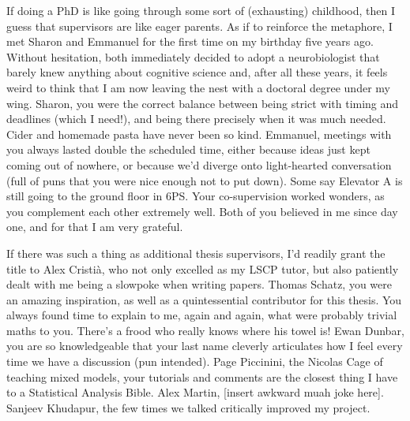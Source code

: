\documentclass[12pt, twoside]{report}
\begin{document}
If doing a PhD is like going through some sort of (exhausting) childhood, then I guess that supervisors are like eager parents. As if to reinforce the metaphore, I met Sharon and Emmanuel for the first time on my birthday five years ago. Without hesitation, both immediately decided to adopt a neurobiologist that barely knew anything about cognitive science and, after all these years, it feels weird to think that I am now leaving the nest with a doctoral degree under my wing. Sharon, you were the correct balance between being strict with timing and deadlines (which I need!), and being there precisely when it was much needed. Cider and homemade pasta have never been so kind. Emmanuel, meetings with you always lasted double the scheduled time, either because ideas just kept coming out of nowhere, or because we'd diverge onto light-hearted conversation (full of puns that you were nice enough not to put down). Some say Elevator A is still going to the ground floor in 6PS. Your co-supervision worked wonders, as you complement each other extremely well. Both of you believed in me since day one, and for that I am very grateful.          

If there was such a thing as additional thesis supervisors, I'd readily grant the title to Alex Cristià, who not only excelled as my LSCP tutor, but also patiently dealt with me being a slowpoke when writing papers.
Thomas Schatz, you were an amazing inspiration, as well as a quintessential contributor for this thesis. You always found time to explain to me, again and again, what were probably trivial maths to you. There's a frood who really knows where his towel is! Ewan Dunbar, you are so knowledgeable that your last name cleverly articulates how I feel every time we have a discussion (pun intended). 
Page Piccinini, the Nicolas Cage of teaching mixed models, your tutorials and comments are the closest thing I have to a Statistical Analysis Bible.
Alex Martin, [insert awkward muah joke here].
Sanjeev Khudapur, the few times we talked critically improved my project.\\
\end{document}
